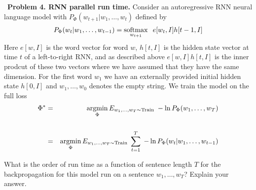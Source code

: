 \documentclass{article}
\newcommand{\solution}[1]{}
\begin{document}
\solution{
  \begin{eqnarray*}
    G^R[b,t,j] & = & \sigma\left(W^{h,GR}[j,I]{\color{red} h[b,t\!-\!1,I]} + W^{x,GR}[j,K]{\color{red} x[b,t,K]} - B^{GR}R[j]\right) \\
    \\
    R[b,t,j] & = & \mathrm{tanh}\left(\begin{array}{l}G^R[b,t,j]\;(W^{h,R}[j,I]{\color{red} h[b,t\!-\!1,I]} - B^{h,R}[j]) \\ \\ +\;\; (1-G^R[b,t,j])\;(W^{x,R}[j,K]{\color{red} x[b,t,K]} - B^{x,R}[j])\end{array}\right) \\
    \\
      \\
      G^h[b,t,j] & = & \sigma\left(W^{h,Gh}[j,I]{\color{red} h[b,t\!-\!1,I]} + W^{x,Gh}[j,K]{\color{red} x[b,t,K]} - B^{Gh}[j]\right) \\
      \\
      h[b,t,j] & = & {\color{red} G^h[b,t,j]}h[b,t\!-\!1,j] + {\color{red} (1-G^h[b,t,j])}R[b,t,j]
\end{eqnarray*}
    }

\bigskip
~{\bf Problem 4. RNN parallel run time.}  Consider an autoregressive RNN neural language model with $P_\Phi(w_{t+1}|w_1,\ldots,w_t)$ defined by
$$P_\Phi(w_t| w_1,\ldots,w_{t-1}) = \operatorname*{softmax}_{w_{t+1}}\;\;e[w_t,I]h[t-1,I]$$
Here $e[w,I]$ is the word vector for word $w$, $h[t,I]$ is the hidden state vector at time $t$ of a left-to-right RNN, and as described above $e[w,I]h[t,I]$
is the inner prodcut of these two vectors where we have assumed that they have the same dimension.
For the first word $w_1$ we have an externally provided initial hidden state $h[0,I]$ and $w_1,\ldots,w_0$ denotes the empty string.
We train the model on the full loss
\begin{eqnarray*}
  \Phi^* &  = & \operatorname*{argmin}_\Phi E_{w_1,\ldots,w_T \sim \mathrm{Train}}\;-\ln P_\Phi(w_1,\ldots,w_T) \\
  \\
  & = & \operatorname*{argmin}_\Phi E_{w_1,\ldots,w_T \sim \mathrm{Train}}\;\sum_{t=1}^T\;-\ln P_\Phi(w_t|w_1,\ldots,w_{t-1})
\end{eqnarray*}

\medskip
What is the order of run time as a function of sentence length $T$ for the backpropagation for this model
run on a sentence $w_1,\ldots,w_T$?  Explain your answer.

\solution{
  The backprogation takes $O(T)$ time (not $O(T^2)$). The model consists of $O(T)$ objects each of which performs a single forward operation and a single backward operation.
  As the backpropagation procedes more of the loss terms in the sum over $t$ get incorporated.
}
\end{document}
